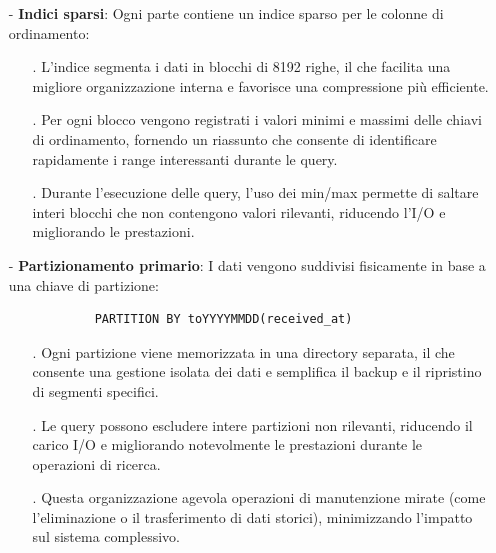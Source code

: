 \documentclass[10pt]{article}
\begin{document}
\begin{itemize}
            \item[-] \textbf{Indici sparsi}: Ogni parte contiene un indice sparso per le colonne di ordinamento:
            \begin{itemize}
                \item[.] L'indice segmenta i dati in blocchi di 8192 righe, il che facilita una migliore organizzazione interna e favorisce una compressione più efficiente.
                \item[.] Per ogni blocco vengono registrati i valori minimi e massimi delle chiavi di ordinamento, fornendo un riassunto che consente di identificare rapidamente i range interessanti durante le query.
                \item[.] Durante l'esecuzione delle query, l'uso dei min/max permette di saltare interi blocchi che non contengono valori rilevanti, riducendo l'I/O e migliorando le prestazioni.    
            \end{itemize}

            \item[-] \textbf{Partizionamento primario}: I dati vengono suddivisi fisicamente in base a una chiave di partizione:
            \begin{lstlisting}
            PARTITION BY toYYYYMMDD(received_at)
            \end{lstlisting}
            \begin{itemize}
                \item[.] Ogni partizione viene memorizzata in una directory separata, il che consente una gestione isolata dei dati e semplifica il backup e il ripristino di segmenti specifici.
                \item[.] Le query possono escludere intere partizioni non rilevanti, riducendo il carico I/O e migliorando notevolmente le prestazioni durante le operazioni di ricerca.
                \item[.] Questa organizzazione agevola operazioni di manutenzione mirate (come l’eliminazione o il trasferimento di dati storici), minimizzando l’impatto sul sistema complessivo.
            \end{itemize}


\end{itemize}
\end{document}
